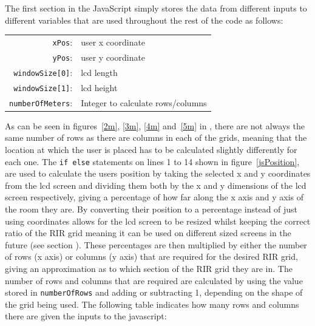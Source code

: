\documentclass[../../main.tex]{subfiles}
\begin{document}
				The first section in the JavaScript simply stores the data from different inputs to different variables that are used throughout the rest of the code as follows:

				\begin{center}
				\begin{tabular}{r l}
					\texttt{xPos}: & user x coordinate \\
					\texttt{yPos}: & user y coordinate \\
					\texttt{windowSize[0]}: & lcd length \\
					\texttt{windowSize[1]}: & lcd height \\
					\texttt{numberOfMeters}: & Integer to calculate rows/columns \\
				\end{tabular}
				\end{center}

				\vspace{5mm}

				As can be seen in figures~\ref{2m}, \ref{3m}, \ref{4m} and~\ref{5m} in , there are not always the same number of rows as there are columns in each of the grids, meaning that the location at which the user is placed has to be calculated slightly differently for each one. The \texttt{if else} statements on lines 1 to 14 shown in figure~\ref{jsPosition}, are used to calculate the users position by taking the selected x and y coordinates from the lcd screen and dividing them both by the x and y dimensions of the lcd screen respectively, giving a percentage of how far along the x axis and y axis of the room they are. By converting their position to a percentage instead of just using coordinates allows for the lcd screen to be resized whilst keeping the correct ratio of the \ac{RIR} grid meaning it can be used on different sized screens in the future (see section ). These percentages are then multiplied by either the number of rows (x axis) or columns (y axis) that are required for the desired \ac{RIR} grid, giving an approximation as to which section of the \ac{RIR} grid they are in. The number of rows and columns that are required are calculated by using the value stored in \texttt{numberOfRows} and adding or subtracting 1, depending on the shape of the grid being used. The following table indicates how many rows and columns there are given the inputs to the javascript:

				\vspace{5mm}
\end{document}

